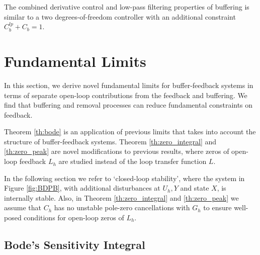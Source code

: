 \documentclass[letterpaper, 10 pt,  conference]{ieeeconf}  %
\begin{document}
The combined derivative control and low-pass filtering properties of buffering is similar to a two degrees-of-freedom controller \cite{ASTM08,SKOP05} with an additional constraint $C_b^{lp}+C_b=1$.

\section{Fundamental Limits}\label{sect:constraint} 

In this section, we derive novel fundamental limits for buffer-feedback systems in terms of separate open-loop contributions from the feedback and buffering. We find that buffering and removal processes can reduce fundamental constraints on feedback.

Theorem \ref{th:bode} is an application of previous limits \cite{DOYFT90} that takes into account the structure of buffer-feedback systems. Theorem \ref{th:zero_integral} and \ref{th:zero_peak} are novel modifications to previous results, where zeros of open-loop feedback $L_h$ are studied instead of the loop transfer function $L$.

In the following section we refer to `closed-loop stability', where the system in Figure \ref{fig:BDPB}, with additional disturbances at $U_h,Y$ and state $X$, is internally stable. Also, in Theorem \ref{th:zero_integral} and \ref{th:zero_peak} we assume that $C_h$ has no unstable pole-zero cancellations with $G_h$ to ensure well-posed conditions for open-loop zeros of $L_h$.

\subsection{Bode's Sensitivity Integral}
\end{document}
